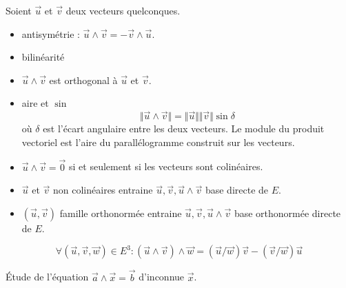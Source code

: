 \begin{prop} Soient $\overrightarrow u$ et $\overrightarrow v$ deux vecteurs quelconques.
\begin{itemize}
 \item antisymétrie : $\overrightarrow u \wedge \overrightarrow v = -\overrightarrow v \wedge \overrightarrow u$.
 \item bilinéarité
 \item $\overrightarrow u \wedge \overrightarrow v$ est orthogonal à $\overrightarrow u$ et $\overrightarrow v$.
 \item aire et $\sin$
\begin{displaymath}
 \Vert \overrightarrow u \wedge \overrightarrow v\Vert =
 \Vert \overrightarrow u \Vert  \Vert\overrightarrow v\Vert \sin \delta
\end{displaymath}
où $\delta$ est l'écart angulaire entre les deux vecteurs. Le module du produit vectoriel est l'aire du parallélogramme construit sur les vecteurs.
\item  $\overrightarrow u \wedge \overrightarrow v = \overrightarrow 0$ si et seulement si les vecteurs sont colinéaires.
\item $\overrightarrow u$ et $\overrightarrow v$ non colinéaires entraine $\overrightarrow u, \overrightarrow v,\overrightarrow u \wedge \overrightarrow v$ base directe de $E$. 
\item $(\overrightarrow u,\overrightarrow v)$ famille orthonormée entraine $\overrightarrow u, \overrightarrow v,\overrightarrow u \wedge \overrightarrow v$ base orthonormée directe de $E$. 
\end{itemize}
\end{prop}
\begin{demo}
 
\end{demo}

\begin{prop}
 \begin{displaymath}
 \forall(\overrightarrow u, \overrightarrow v, \overrightarrow w)\in E^3 : 
(\overrightarrow u \wedge \overrightarrow v ) \wedge \overrightarrow w
= (\overrightarrow u / \overrightarrow w )\overrightarrow v 
- (\overrightarrow v / \overrightarrow w )\overrightarrow u
\end{displaymath}
\end{prop}
\begin{demo}
 
\end{demo}
\'Etude de l'équation $\overrightarrow a \wedge \overrightarrow x =\overrightarrow b$ d'inconnue $\overrightarrow x$.
